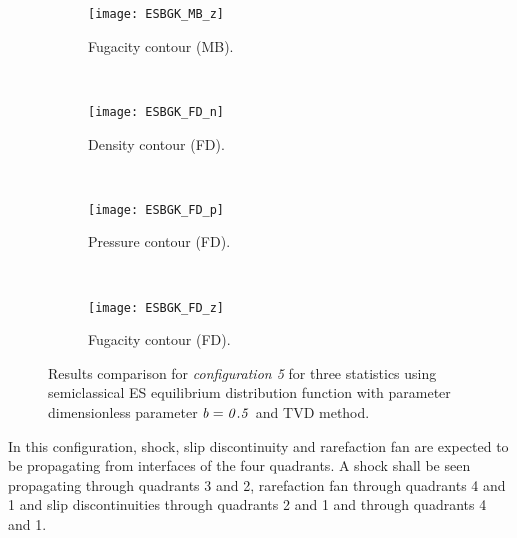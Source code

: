 \documentclass{rsproca}%
\begin{document}
\begin{figure}
\begin{subfigure}[b]{0.32\textwidth}
                \centering
                \texttt{[image: ESBGK\_MB\_z]}
                \caption{Fugacity contour (MB).}
                \label{fig:5ESBGK_MB_z}
        \end{subfigure}
        ~ %
        \begin{subfigure}[b]{0.32\textwidth}
                \centering
                \texttt{[image: ESBGK\_FD\_n]}
                \caption{Density contour (FD).}
                \label{fig:5ESBGK_FD_n}
        \end{subfigure}
        ~ %
        \begin{subfigure}[b]{0.32\textwidth}
                \centering
                \texttt{[image: ESBGK\_FD\_p]}
                \caption{Pressure contour (FD).}
                \label{fig:5ESBGK_FD_p}
        \end{subfigure}
				~ %
        \begin{subfigure}[b]{0.32\textwidth}
                \centering
                \texttt{[image: ESBGK\_FD\_z]}
                \caption{Fugacity contour (FD).}
                \label{fig:5ESBGK_FD_z}
        \end{subfigure}
				\caption{Results comparison for \emph{configuration 5} for three statistics using semiclassical ES equilibrium distribution function with parameter dimensionless parameter $\it{b=0.5}$ and TVD method.} 
				\label{fig:test_configuration5}
\end{figure}
In this configuration, shock, slip discontinuity and rarefaction fan are expected to be propagating from interfaces of the four quadrants. A shock shall be seen propagating through quadrants 3 and 2, rarefaction fan through quadrants 4 and 1 and slip discontinuities through quadrants 2 and 1 and through quadrants 4 and 1.
\end{document}

